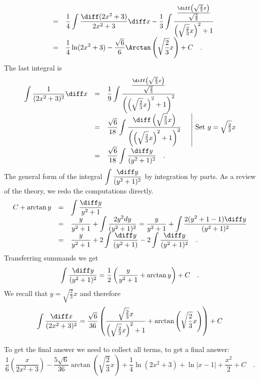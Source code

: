 {\[\begin{array}{rcl}
&=&\displaystyle  \frac{1}{4} \int \frac{\diff(2x^2+3)}{2x^2+3}\diff x- \frac{1}{3}\int \frac{\frac{\diff \left(\sqrt{\frac23}x\right)} {\sqrt{\frac23}}} {\left( \sqrt{\frac23}x\right)^2+1} \\
&=&\displaystyle   \frac{1}{4}\ln (2x^2+3)-\frac{\sqrt{6}}{6}\Arctan \left(\sqrt{\frac23}x\right)+C
\quad .
\end{array}
\]
The last integral is
\[
\begin{array}{rcll|l}
\displaystyle \int \frac{1}{(2x^2+3)^2}\diff x&=&\displaystyle  \frac{1}{9} \int \frac{\frac{\diff\left(\sqrt{\frac{2}{3}}x\right)}{\sqrt{\frac23}}}{\left(\left(\sqrt{\frac23}x\right)^2+1\right)^2}\\
&=&\displaystyle  \frac{\sqrt{6}}{18}\int \frac{\diff\left(\sqrt{\frac23}x\right)}{\left(\left(\sqrt{\frac23}x\right)^2+1\right)^2} &&\text{Set }y=\sqrt{\frac23}x\\
&=&\displaystyle  \frac{\sqrt{6}}{18}\int \frac{\diff y}{(y^2+1)^2}\quad.
\end{array}
\]
The general form of the integral $\displaystyle\int \frac{\diff y}{(y^2+1)^2}$  by integration by parts. As a review of the theory, we redo the computations directly.
\[
\begin{array}{rcl}
C+\arctan y &=&\displaystyle \int \frac{\diff y}{y^2+1}\\
&=&\displaystyle \frac{y}{y^2+1} +\int \frac{2y^2dy }{( y^2+ 1 )^2}= \frac{y}{y^2+1}+\int \frac{2(y^2+1-1)\diff y}{(y^2+1)^2}\\
&=&\displaystyle \frac{y}{y^2+1} + 2\int \frac{\diff y}{ ( y^2 +1)}- 2\int \frac{\diff y}{(y^2+1)^2}\quad.
\end{array}
\]
Transferring summands we get
\[
\int \frac{\diff y}{(y^2+1)^2}= \frac{1}{2} \left( \frac{ y }{y^2+1} +\arctan y\right) +C\quad .
\]
We recall that $y=\sqrt{\frac{2}{3}}x$ and therefore
\[
\int \frac{\diff x}{(2x^2+3)^2}=\frac{\sqrt{6}}{36}\left(\frac{\sqrt{\frac{2}{3}}x}{\left(\sqrt{\frac{2}{3}}x\right)^2+1}+\arctan \left( \sqrt{\frac{2}{3}}x\right)\right) +C
\]

To get the final answer we need to collect all terms, to get a final answer:
\[
\frac{1}{6}\left(\frac{x}{2x^2+3}\right) - \frac{5\sqrt{6}}{36} \arctan \left(\sqrt{\frac{2}{3}}x \right) +\frac{1}{4} \ln (2x^2+3) +\ln|x-1|+\frac{x ^2 } 2+ C\quad .
\]
}